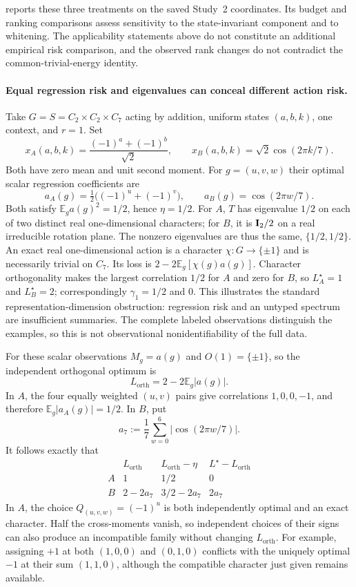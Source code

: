  reports these three treatments on the saved Study~2 coordinates. Its budget and ranking comparisons assess sensitivity to the state-invariant component and to whitening. The applicability statements above do not constitute an additional empirical risk comparison, and the observed rank changes do not contradict the common-trivial-energy identity.

\paragraph{Equal regression risk and eigenvalues can conceal different action risk.}
\label{sp:counterexample}
Take $G=S=C_2\times C_2\times C_7$ acting by addition, uniform states $(a,b,k)$, one context, and $r=1$. Set
\[
 x_A(a,b,k)=\frac{(-1)^a+(-1)^b}{\sqrt2},\qquad
 x_B(a,b,k)=\sqrt2\cos(2\pi k/7).
\]
Both have zero mean and unit second moment. For $g=(u,v,w)$ their optimal scalar regression coefficients are
\[
 a_A(g)=\tfrac12\big((-1)^u+(-1)^v\big),\qquad
 a_B(g)=\cos(2\pi w/7).
\]
Both satisfy $\mathbb E_g a(g)^2=1/2$, hence $\eta=1/2$. For $A$, $T$ has eigenvalue $1/2$ on each of two distinct real one-dimensional characters; for $B$, it is $\mathbf{I}_2/2$ on a real irreducible rotation plane. The nonzero eigenvalues are thus the same, $\{1/2,1/2\}$. An exact real one-dimensional action is a character $\chi:G\to\{\pm1\}$ and is necessarily trivial on $C_7$. Its loss is $2-2\mathbb E_g[\chi(g)a(g)]$. Character orthogonality makes the largest correlation $1/2$ for $A$ and zero for $B$, so $L_A^\star=1$ and $L_B^\star=2$; correspondingly $\gamma_1=1/2$ and $0$. This illustrates the standard representation-dimension obstruction: regression risk and an untyped spectrum are insufficient summaries. The complete labeled observations distinguish the examples, so this is not observational nonidentifiability of the full data.

For these scalar observations $M_g=a(g)$ and $O(1)=\{\pm1\}$, so the independent orthogonal optimum is
\[
 L_{\mathrm{orth}}
 =
 2-2\mathbb E_g|a(g)|.
\]
In $A$, the four equally weighted $(u,v)$ pairs give correlations $1,0,0,-1$, and therefore $\mathbb E_g|a_A(g)|=1/2$. In $B$, put
\[
 a_7:=\frac17\sum_{w=0}^6|\cos(2\pi w/7)|.
\]
It follows exactly that
\[
\begin{array}{c|ccc}
 & L_{\mathrm{orth}} & L_{\mathrm{orth}}-\eta & L^\star-L_{\mathrm{orth}}\\
 \hline
 A & 1 & 1/2 & 0\\
 B & 2-2a_7 & 3/2-2a_7 & 2a_7
\end{array}
\]
In $A$, the choice $Q_{(u,v,w)}=(-1)^u$ is both independently optimal and an exact character. Half the cross-moments vanish, so independent choices of their signs can also produce an incompatible family without changing $L_{\mathrm{orth}}$. For example, assigning $+1$ at both $(1,0,0)$ and $(0,1,0)$ conflicts with the uniquely optimal $-1$ at their sum $(1,1,0)$, although the compatible character just given remains available.

